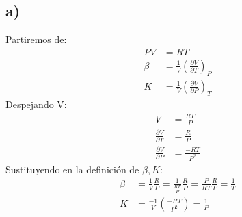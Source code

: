 \documentclass{article}
\begin{document}
\begin{tcolorbox}[breakable]
    \subsection*{a)}
    Partiremos de:
    \begin{align*}
        PV &= RT \\
        \beta &= \frac{1}{V}\left(\frac{\partial V}{\partial T}\right)_P \\
         K &= \frac{1}{V}\left(\frac{\partial V}{\partial P}\right)_T
    \end{align*}
    Despejando V:
    \begin{align*}
        V 
        &= \frac{RT}{P}\\
        \frac{\partial V}{\partial T} 
        &= \frac{R}{P} \\
        \frac{\partial V}{ \partial P} 
        &= \frac{-RT}{P^2}   
    \end{align*}
    Sustituyendo en la definición de $\beta, K$:
    \begin{align*}
        \beta 
        &= \frac{1}{V} \frac{R}{P} 
        = \frac{1}{\frac{RT}{P}} \frac{R}{P} 
        = \frac{P}{RT} \frac{R}{P} = \frac{1}{T} \\
        K 
        &= \frac{-1}{V} \left(\frac{-RT}{P^2} \right)
        = \frac{1}{P}
    \end{align*}

\end{tcolorbox}
\end{document}
